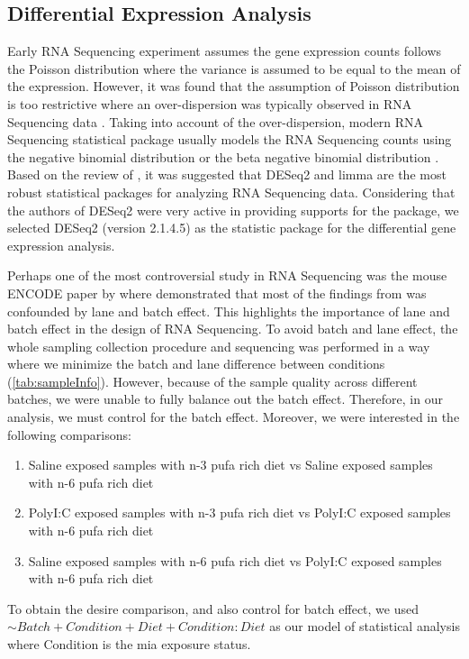 \subsection{Differential Expression Analysis}
Early RNA Sequencing experiment assumes the gene expression counts follows the Poisson distribution \citep{Marioni2008} where the variance is assumed to be equal to the mean of the expression.
However, it was found that the assumption of Poisson distribution is too restrictive where an over-dispersion was typically observed in RNA Sequencing data \citep{Anders2010}.
Taking into account of the over-dispersion, modern RNA Sequencing statistical package usually models the RNA Sequencing counts using the negative binomial distribution \citep{Anders2010,Robinson2010} or the beta negative binomial distribution \citep{Trapnell2012}.
Based on the review of \citet{Seyednasrollah2015}, it was suggested that DESeq2 and limma are the most robust statistical packages for analyzing RNA Sequencing data. 
Considering that the authors of DESeq2 were very active in providing supports for the package, we selected DESeq2 (version 2.1.4.5) \citep{Love2014} as the statistic package for the differential gene expression analysis.

Perhaps one of the most controversial study in RNA Sequencing was the mouse ENCODE  paper by \citet{Yue2014} where \citet{Gilad2015} demonstrated that most of the findings from \citet{Yue2014} was confounded by lane and batch effect.
This highlights the importance of lane and batch effect in the design of RNA Sequencing.
To avoid batch and lane effect, the whole sampling collection procedure and sequencing was performed in a way where we minimize the batch and lane difference between conditions (\cref{tab:sampleInfo}). 
However, because of the sample quality across different batches, we were unable to fully balance out the batch effect. 
Therefore, in our analysis, we must control for the batch effect.
Moreover, we were interested in the following comparisons:
\begin{enumerate}
	\item Saline exposed samples with n-3 \gls{pufa} rich diet vs Saline exposed samples with n-6 \gls{pufa} rich diet 
	\item PolyI:C exposed samples with n-3 \gls{pufa} rich diet vs PolyI:C exposed samples with n-6 \gls{pufa} rich diet 
	\item Saline exposed samples with n-6 \gls{pufa} rich diet vs PolyI:C exposed samples with n-6 \gls{pufa} rich diet 
\end{enumerate}
To obtain the desire comparison, and also control for batch effect, we used $\sim Batch+Condition+Diet+Condition:Diet$ as our model of statistical analysis where Condition is the \gls{mia} exposure status.

